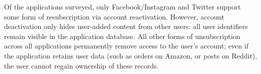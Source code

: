 Of the applications surveyed, only Facebook/Instagram and Twitter support some form of
resubscription via account reactivation. However, account deactivation only hides user-added content from
other users: all user identifiers remain visible in the application database. All other forms
of unsubscription across all applications permanently remove access to the user's account; even if
the application retains user data (such as orders on Amazon, or posts on Reddit), the user cannot
regain ownership of these records.

%
%
%
%
